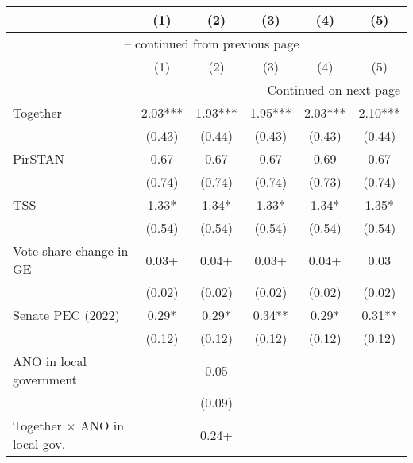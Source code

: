 \begin{longtable}{lccccc}
\toprule
  & (1) & (2) & (3) & (4) & (5) \\
\midrule
\endfirsthead

\multicolumn{6}{c}{{\tablename\ \thetable{} -- continued from previous page}} \\
\toprule
  & (1) & (2) & (3) & (4) & (5) \\
\midrule
\endhead

\bottomrule
\multicolumn{6}{r}{{Continued on next page}} \\
\endfoot

\bottomrule
\endlastfoot

Together                                & \num{2.03}***  & \num{1.93}***  & \num{1.95}***  & \num{2.03}***  & \num{2.10}***  \\
& (\num{0.43})   & (\num{0.44})   & (\num{0.43})   & (\num{0.43})   & (\num{0.44})   \\
PirSTAN                                 & \num{0.67}     & \num{0.67}     & \num{0.67}     & \num{0.69}     & \num{0.67}     \\
& (\num{0.74})   & (\num{0.74})   & (\num{0.74})   & (\num{0.73})   & (\num{0.74})   \\
TSS                                     & \num{1.33}*    & \num{1.34}*    & \num{1.33}*    & \num{1.34}*    & \num{1.35}*    \\
& (\num{0.54})   & (\num{0.54})   & (\num{0.54})   & (\num{0.54})   & (\num{0.54})   \\
Vote share change in GE                 & \num{0.03}+    & \num{0.04}+    & \num{0.03}+    & \num{0.04}+    & \num{0.03}     \\
& (\num{0.02})   & (\num{0.02})   & (\num{0.02})   & (\num{0.02})   & (\num{0.02})   \\
Senate PEC (2022)                       & \num{0.29}*    & \num{0.29}*    & \num{0.34}**   & \num{0.29}*    & \num{0.31}**   \\
& (\num{0.12})   & (\num{0.12})   & (\num{0.12})   & (\num{0.12})   & (\num{0.12})   \\
ANO in local government                 &                 & \num{0.05}     &                 &                 &                 \\
&                 & (\num{0.09})   &                 &                 &                 \\
Together × ANO in local gov.            &                 & \num{0.24}+    &                 &                 &                 \\

\end{longtable}
